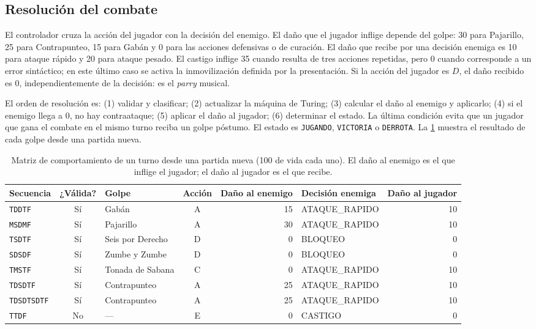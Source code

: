 \documentclass[9pt]{ieeeconf}
\newcommand{\tk}[1]{\texttt{#1}}
\begin{document}
\subsection{Resolución del combate}
\label{sec:combate}

El controlador cruza la acción del jugador con la decisión del enemigo. El daño que el jugador inflige depende del golpe: 30 para Pajarillo, 25 para Contrapunteo, 15 para Gabán y 0 para las acciones defensivas o de curación. El daño que recibe por una decisión enemiga es 10 para ataque rápido y 20 para ataque pesado. El castigo inflige 35 cuando resulta de tres acciones repetidas, pero 0 cuando corresponde a un error sintáctico; en este último caso se activa la inmovilización definida por la presentación. Si la acción del jugador es $D$, el daño recibido es 0, independientemente de la decisión: es el \emph{parry} musical.

El orden de resolución es: (1) validar y clasificar; (2) actualizar la máquina de Turing; (3) calcular el daño al enemigo y aplicarlo; (4) si el enemigo llega a 0, no hay contraataque; (5) aplicar el daño al jugador; (6) determinar el estado. La última condición evita que un jugador que gana el combate en el mismo turno reciba un golpe póstumo. El estado es \texttt{JUGANDO}, \texttt{VICTORIA} o \texttt{DERROTA}. La \cref{tab:comportamiento} muestra el resultado de cada golpe desde una partida nueva.

\begin{table}[t]
\centering
\caption{Matriz de comportamiento de un turno desde una partida nueva (100 de vida cada uno). El daño al enemigo es el que inflige el jugador; el daño al jugador es el que recibe.}
\label{tab:comportamiento}
\begin{tabular}{l c l c r l r}
\toprule
\textbf{Secuencia} & \textbf{¿Válida?} & \textbf{Golpe} & \textbf{Acción} & \textbf{Daño al enemigo} & \textbf{Decisión enemiga} & \textbf{Daño al jugador} \\
\midrule
\tk{TDDTF} & Sí & Gabán & A & 15 & ATAQUE\_RAPIDO & 10 \\
\tk{MSDMF} & Sí & Pajarillo & A & 30 & ATAQUE\_RAPIDO & 10 \\
\tk{TSDTF} & Sí & Seis por Derecho & D & 0 & BLOQUEO & 0 \\
\tk{SDSDF} & Sí & Zumbe y Zumbe & D & 0 & BLOQUEO & 0 \\
\tk{TMSTF} & Sí & Tonada de Sabana & C & 0 & ATAQUE\_RAPIDO & 10 \\
\tk{TDSDTF} & Sí & Contrapunteo & A & 25 & ATAQUE\_RAPIDO & 10 \\
\tk{TDSDTSDTF} & Sí & Contrapunteo & A & 25 & ATAQUE\_RAPIDO & 10 \\
\tk{TTDF} & No & --- & E & 0 & CASTIGO & 0 \\
\bottomrule
\end{tabular}
\end{table}
\end{document}
